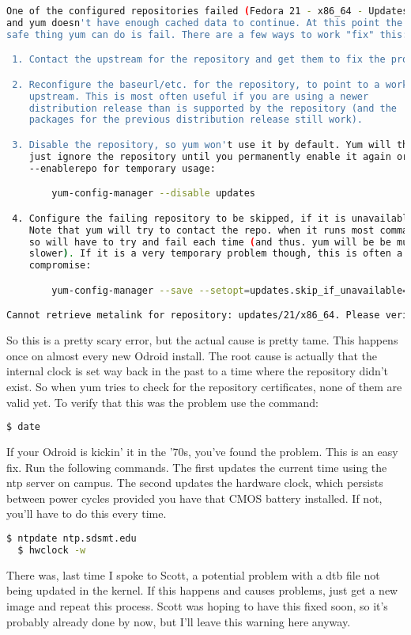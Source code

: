 \begin{lstlisting}[language=bash,breaklines=true]
  One of the configured repositories failed (Fedora 21 - x86_64 - Updates),
and yum doesn't have enough cached data to continue. At this point the only
safe thing yum can do is fail. There are a few ways to work "fix" this:

 1. Contact the upstream for the repository and get them to fix the problem.

 2. Reconfigure the baseurl/etc. for the repository, to point to a working
    upstream. This is most often useful if you are using a newer
    distribution release than is supported by the repository (and the
    packages for the previous distribution release still work).

 3. Disable the repository, so yum won't use it by default. Yum will then
    just ignore the repository until you permanently enable it again or use
    --enablerepo for temporary usage:

        yum-config-manager --disable updates

 4. Configure the failing repository to be skipped, if it is unavailable.
    Note that yum will try to contact the repo. when it runs most commands,
    so will have to try and fail each time (and thus. yum will be be much
    slower). If it is a very temporary problem though, this is often a nice
    compromise:

        yum-config-manager --save --setopt=updates.skip_if_unavailable=true

Cannot retrieve metalink for repository: updates/21/x86_64. Please verify its path and try again.	
\end{lstlisting}

So this is a pretty scary error, but the actual cause is pretty tame. This happens once on almost every new Odroid install. The root cause is actually that the internal clock is set way back in the past to a time where the repository didn't exist. So when yum tries to check for the repository certificates, none of them are valid yet. To verify that this was the problem use the command:

\begin{lstlisting}[language=bash]
  $ date
\end{lstlisting}

If your Odroid is kickin' it in the '70s, you've found the problem. This is an easy fix. Run the following commands. The first updates the current time using the ntp server on campus. The second updates the hardware clock, which persists between power cycles provided you have that CMOS battery installed. If not, you'll have to do this every time.

\begin{lstlisting}[language=bash]
  $ ntpdate ntp.sdsmt.edu
  $	hwclock -w
\end{lstlisting}

There was, last time I spoke to Scott, a potential problem with a dtb file not being updated in the kernel. If this happens and causes problems, just get a new image and repeat this process. Scott was hoping to have this fixed soon, so it's probably already done by now, but I'll leave this warning here anyway.